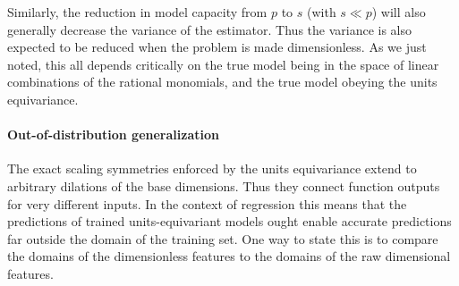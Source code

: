 \documentclass[twoside,11pt]{article}
\newcommand{\unit}[1]{\mathrm{#1}}
\newcommand{\kg}{\unit{kg}}
\begin{document}

Similarly, the reduction in model capacity from $p$ to $s$ (with $s\ll p$) will also generally decrease the variance of the estimator.
Thus the variance is also expected to be reduced when the problem is made dimensionless.
As we just noted, this all depends critically on the true model being in the space of linear combinations of the rational monomials, and the true model obeying the units equivariance.

\paragraph{Out-of-distribution generalization}
The exact scaling symmetries enforced by the units equivariance extend to arbitrary dilations of the base dimensions. Thus they connect function outputs for very different inputs.
In the context of regression this means that the predictions of trained units-equivariant models ought enable accurate predictions far outside the domain of the training set.
One way to state this is to compare the domains of the dimensionless features to the domains of the raw dimensional features.
\end{document}
